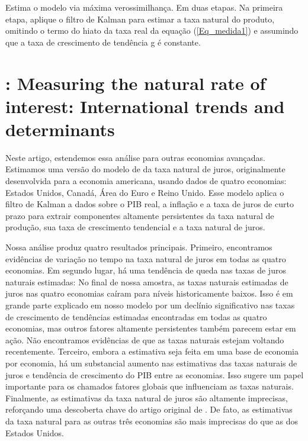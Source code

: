 Estima o modelo via máxima verossimilhança. Em duas etapas. Na primeira etapa, aplique o filtro de Kalman para estimar a taxa natural do produto, omitindo o termo do hiato da taxa real da equação (\ref{Eq_medida1}) e assumindo que a taxa de crescimento de tendência g é constante.
%
%
\section{\citet{HLW:2017}: Measuring the natural rate of interest: International trends and determinants}

Neste artigo, estendemos essa análise para outras economias avançadas. Estimamos uma versão do modelo de \citet{LW:2003} da taxa natural de juros, originalmente desenvolvida para a economia americana, usando dados de quatro economias: Estados Unidos, Canadá, Área do Euro e Reino Unido. Esse modelo aplica o filtro de Kalman a dados sobre o PIB real, a inflação e a taxa de juros de curto prazo para extrair componentes altamente persistentes da taxa natural de produção, sua taxa de crescimento tendencial e a taxa natural de juros.

Nossa análise produz quatro resultados principais. Primeiro, encontramos evidências de variação no tempo na taxa natural de juros em todas as quatro economias. Em segundo lugar, há uma tendência de queda nas taxas de juros naturais estimadas: No final de nossa amostra, as taxas naturais estimadas de juros nas quatro economias caíram para níveis historicamente baixos. Isso é em grande parte explicado em nosso modelo por um declínio significativo nas taxas de crescimento de tendências estimadas encontradas em todas as quatro economias, mas outros fatores altamente persistentes também parecem estar em ação. Não encontramos evidências de que as taxas naturais estejam voltando recentemente. Terceiro, embora a estimativa seja feita em uma base de economia por economia, há um substancial aumento nas estimativas das taxas naturais de juros e tendência de crescimento do PIB entre as economias. Isso sugere um papel importante para os chamados fatores globais que influenciam as taxas naturais. Finalmente, as estimativas da taxa natural de juros são altamente imprecisas, reforçando uma descoberta chave do artigo original de \citet{LW:2003}. De fato, as estimativas da taxa natural para as outras três economias são mais imprecisas do que as dos Estados Unidos.

